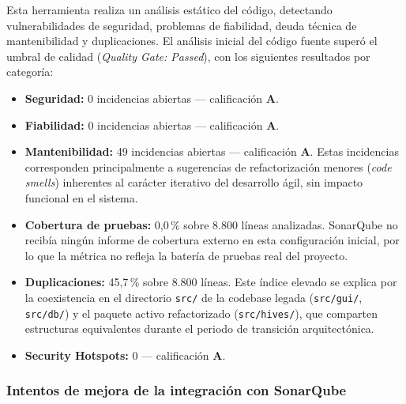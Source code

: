 Esta herramienta realiza un análisis estático del código, detectando
vulnerabilidades de seguridad, problemas de fiabilidad, deuda técnica de
mantenibilidad y duplicaciones. El análisis inicial del código fuente superó
el umbral de calidad (\textit{Quality Gate: Passed}), con los siguientes
resultados por categoría:

\begin{itemize}
    \item \textbf{Seguridad:} 0 incidencias abiertas — calificación \textbf{A}.
    \item \textbf{Fiabilidad:} 0 incidencias abiertas — calificación \textbf{A}.
    \item \textbf{Mantenibilidad:} 49 incidencias abiertas — calificación
    \textbf{A}. Estas incidencias corresponden principalmente a sugerencias
    de refactorización menores (\textit{code smells}) inherentes al carácter
    iterativo del desarrollo ágil, sin impacto funcional en el sistema.
    \item \textbf{Cobertura de pruebas:} 0{,}0\,\% sobre 8.800 líneas
    analizadas. SonarQube no recibía ningún informe de cobertura externo en
    esta configuración inicial, por lo que la métrica no refleja la batería
    de pruebas real del proyecto.
    \item \textbf{Duplicaciones:} 45{,}7\,\% sobre 8.800 líneas. Este índice
    elevado se explica por la coexistencia en el directorio \texttt{src/} de
    la codebase legada (\texttt{src/gui/}, \texttt{src/db/}) y el paquete
    activo refactorizado (\texttt{src/hives/}), que comparten estructuras
    equivalentes durante el periodo de transición arquitectónica.
    \item \textbf{Security Hotspots:} 0 — calificación \textbf{A}.
\end{itemize}


\subsubsection*{Intentos de mejora de la integración con SonarQube}


